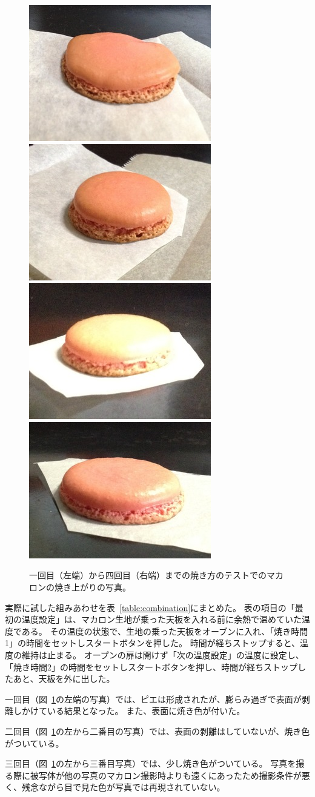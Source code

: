 \documentclass[uplatex,dvipdfmx,a4j,12pt]{jsarticle}
\begin{document}
\begin{figure}[b]
    \centering
    \includegraphics[width=0.22\linewidth]{fig02.jpg}
    \includegraphics[width=0.22\linewidth]{fig03.jpg}
    \includegraphics[width=0.22\linewidth]{fig04.jpg}
    \includegraphics[width=0.22\linewidth]{fig05.jpg}
    \caption{一回目（左端）から四回目（右端）までの焼き方のテストでのマカロンの焼き上がりの写真。}
    \label{fig:fig02}
\end{figure}

実際に試した組みあわせを表~\ref{table:combination}にまとめた。
表の項目の「最初の温度設定」は、マカロン生地が乗った天板を入れる前に余熱で温めていた温度である。
その温度の状態で、生地の乗った天板をオーブンに入れ、「焼き時間1」の時間をセットしスタートボタンを押した。
時間が経ちストップすると、温度の維持は止まる。
オープンの扉は開けず「次の温度設定」の温度に設定し、「焼き時間2」の時間をセットしスタートボタンを押し、時間が経ちストップしたあと、天板を外に出した。

一回目（図~\ref{fig:fig02}の左端の写真）では、ピエは形成されたが、膨らみ過ぎで表面が剥離しかけている結果となった。
また、表面に焼き色が付いた。

二回目（図~\ref{fig:fig02}の左から二番目の写真）では、表面の剥離はしていないが、焼き色がついている。

三回目（図~\ref{fig:fig02}の左から三番目写真）では、少し焼き色がついている。
写真を撮る際に被写体が他の写真のマカロン撮影時よりも遠くにあったため撮影条件が悪く、残念ながら目で見た色が写真では再現されていない。
\end{document}
